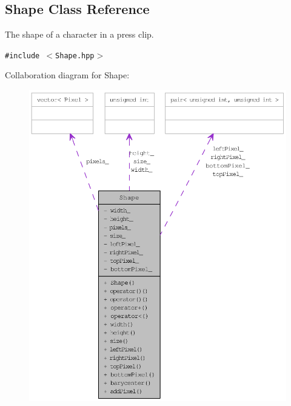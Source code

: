 \hypertarget{class_shape}{
\subsection{Shape Class Reference}
\label{class_shape}
}
The shape of a character in a press clip.  


{\tt \#include $<$Shape.hpp$>$}

Collaboration diagram for Shape:\nopagebreak
\begin{figure}[H]
\begin{center}
\leavevmode
\includegraphics[width=400pt]{class_shape__coll__graph}
\end{center}
\end{figure}
